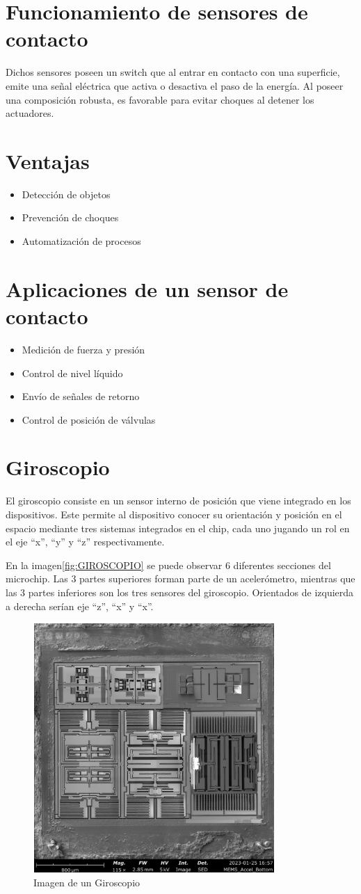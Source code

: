 \section{Funcionamiento de sensores de contacto } 
Dichos sensores poseen un switch que al entrar en contacto con una superficie, emite una señal eléctrica que activa o desactiva el paso de la energía. 
Al poseer una composición robusta,  es favorable para evitar choques al detener los actuadores. 

\section*{Ventajas}
\begin{itemize}
	\item Detección de objetos 
	\item  Prevención de choques  
	\item Automatización de procesos 
\end{itemize}


\section*{Aplicaciones de un sensor de contacto} 
\begin{itemize}
	\item Medición de fuerza y presión 
	\item Control de nivel líquido  
	\item Envío de señales de retorno 
	\item Control de posición de válvulas
\end{itemize}


\section{Giroscopio}
El giroscopio consiste en un sensor interno de posición que viene integrado en los dispositivos. Este permite al dispositivo conocer su orientación y posición en el espacio mediante tres sistemas integrados en el chip, cada uno jugando un rol en el eje “x”, “y” y “z” respectivamente.

En la imagen\autoref{fig:GIROSCOPIO} se puede observar 6 diferentes secciones del microchip. Las 3 partes superiores forman parte de un acelerómetro, mientras que las 3 partes inferiores son los tres sensores del giroscopio. Orientados de izquierda a derecha serían eje “z”, “x” y “x”.

\begin{figure}[h]
	\centering
	\includegraphics[width=0.3\linewidth]{img/GIROSCOPIO}
	\caption{Imagen de un Giroscopio  }
	\label{fig:GIROSCOPIO}
\end{figure}

